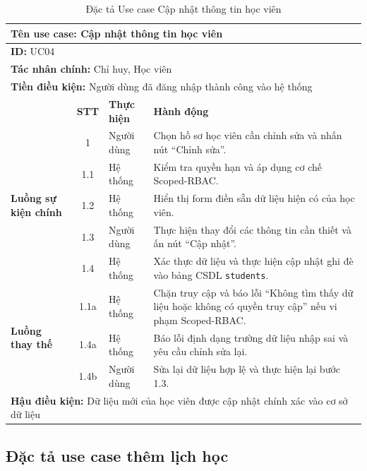 \documentclass[../DoAn.tex]{subfiles}
\begin{document}
\begin{table}[H]
\centering
\small
\renewcommand{\arraystretch}{1.2}
\begin{tabular}{|p{2.2cm}|c|p{2cm}|p{8.5cm}|}
\hline
\multicolumn{4}{|l|}{\textbf{Tên use case:} Cập nhật thông tin học viên} \\ \hline
\multicolumn{4}{|l|}{\textbf{ID:} UC04} \\ \hline
\multicolumn{4}{|l|}{\textbf{Tác nhân chính:} Chỉ huy, Học viên} \\ \hline
\multicolumn{4}{|l|}{\textbf{Tiền điều kiện:} Người dùng đã đăng nhập thành công vào hệ thống} \\ \hline
 & \textbf{STT} & \textbf{Thực hiện} & \textbf{Hành động} \\ \hline
\multirow{5}{2.2cm}{\textbf{Luồng sự kiện chính}} 
& 1 & Người dùng & Chọn hồ sơ học viên cần chỉnh sửa và nhấn nút ``Chỉnh sửa''. \\ \cline{2-4}
& 1.1 & Hệ thống & Kiểm tra quyền hạn và áp dụng cơ chế Scoped-RBAC. \\ \cline{2-4}
& 1.2 & Hệ thống & Hiển thị form điền sẵn dữ liệu hiện có của học viên. \\ \cline{2-4}
& 1.3 & Người dùng & Thực hiện thay đổi các thông tin cần thiết và ấn nút ``Cập nhật''. \\ \cline{2-4}
& 1.4 & Hệ thống & Xác thực dữ liệu và thực hiện cập nhật ghi đè vào bảng CSDL \texttt{students}. \\ \hline
\multirow{3}{2.2cm}{\textbf{Luồng thay thế}} 
& 1.1a & Hệ thống & Chặn truy cập và báo lỗi ``Không tìm thấy dữ liệu hoặc không có quyền truy cập'' nếu vi phạm Scoped-RBAC. \\ \cline{2-4}
& 1.4a & Hệ thống & Báo lỗi định dạng trường dữ liệu nhập sai và yêu cầu chỉnh sửa lại. \\ \cline{2-4}
& 1.4b & Người dùng & Sửa lại dữ liệu hợp lệ và thực hiện lại bước 1.3. \\ \hline
\multicolumn{4}{|l|}{\textbf{Hậu điều kiện:} Dữ liệu mới của học viên được cập nhật chính xác vào cơ sở dữ liệu} \\ \hline
\end{tabular}
\caption{Đặc tả Use case Cập nhật thông tin học viên}
\label{table:uc_update_student}
\end{table}



\subsection{Đặc tả use case thêm lịch học}
\hfill
\end{document}
